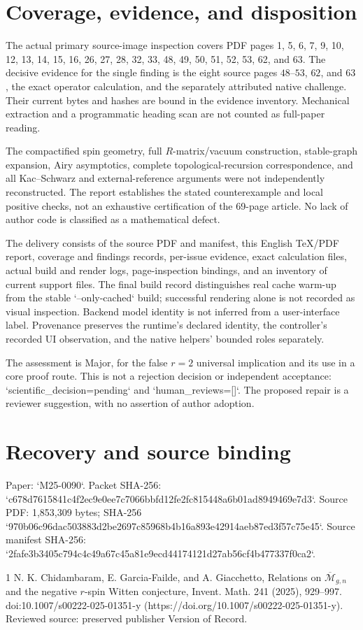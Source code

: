 \documentclass[10pt]{article}
\begin{document}
\section*{Coverage, evidence, and disposition}
The actual primary source-image inspection covers PDF pages 1, 5, 6, 7, 9, 10, 12, 13, 14, 15, 16, 26, 27, 28, 32, 33, 48, 49, 50, 51, 52, 53, 62, and 63. The decisive evidence for the single finding is the eight source pages \(48\)–\(53\), \(62\), and \(63\), the exact operator calculation, and the separately attributed native challenge. Their current bytes and hashes are bound in the evidence inventory. Mechanical extraction and a programmatic heading scan are not counted as full-paper reading.\par
The compactified spin geometry, full \(R\)-matrix/vacuum construction, stable-graph expansion, Airy asymptotics, complete topological-recursion correspondence, and all Kac–Schwarz and external-reference arguments were not independently reconstructed. The report establishes the stated counterexample and local positive checks, not an exhaustive certification of the 69-page article. No lack of author code is classified as a mathematical defect.\par
The delivery consists of the source PDF and manifest, this English TeX/PDF report, coverage and findings records, per-issue evidence, exact calculation files, actual build and render logs, page-inspection bindings, and an inventory of current support files. The final build record distinguishes real cache warm-up from the stable `–only-cached` build; successful rendering alone is not recorded as visual inspection. Backend model identity is not inferred from a user-interface label. Provenance preserves the runtime’s declared identity, the controller’s recorded UI observation, and the native helpers’ bounded roles separately.\par
The assessment is Major, for the false \(r=2\) universal implication and its use in a core proof route. This is not a rejection decision or independent acceptance: `scientific\_decision=pending` and `human\_reviews=[]`. The proposed repair is a reviewer suggestion, with no assertion of author adoption.\par
\section*{Recovery and source binding}
Paper: `M25-0090`. Packet SHA-256: `c678d7615841c4f2ec9e0ee7c7066bbfd12fe2fc815448a6b01ad8949469e7d3`. Source PDF: 1,853,309 bytes; SHA-256
`970b06c96dac503883d2be2697c85968b4b16a893e42914aeb87ed3f57c75e45`. Source manifest SHA-256:
`2fafe3b3405c794c4c49a67c45a81e9ecd44174121d27ab56cf4b477337f0ca2`.\par
1 N. K. Chidambaram, E. Garcia-Failde, and A. Giacchetto, Relations on \(\overline{\mathcal M}_{g,n}\) and the negative \(r\)-spin Witten conjecture, Invent. Math. 241 (2025), 929–997. doi:10.1007/s00222-025-01351-y (https://doi.org/10.1007/s00222-025-01351-y). Reviewed source: preserved publisher Version of Record.\par
\end{document}
